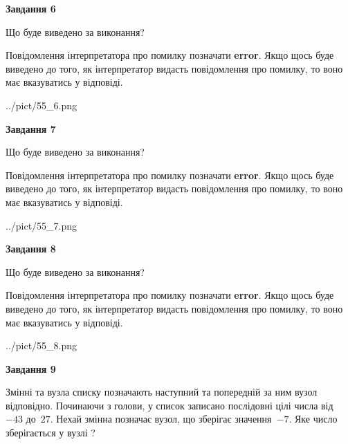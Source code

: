 \documentclass[12pt, ukrainian]{article}
\begin{document}
{\begin {large}
{\begin {center}\textbf{Завдання 6}\end {center}}\par
Що буде виведено за виконання?

Повідомлення інтерпретатора про помилку позначати \textbf{error}.
Якщо щось буде виведено до того, як інтерпретатор видасть повідомлення про помилку, 
то воно має вказуватись у відповіді. \par


\begin{center}
	{../pict/55_6.png}
\end{center}
\newpage

{\begin {center}\textbf{Завдання 7}\end {center}}\par
Що буде виведено за виконання?

Повідомлення інтерпретатора про помилку позначати \textbf{error}.
Якщо щось буде виведено до того, як інтерпретатор видасть повідомлення про помилку, 
то воно має вказуватись у відповіді. \par


\begin{center}
	{../pict/55_7.png}
\end{center}
\newpage

{\begin {center}\textbf{Завдання 8}\end {center}}\par
Що буде виведено за виконання?

Повідомлення інтерпретатора про помилку позначати \textbf{error}.
Якщо щось буде виведено до того, як інтерпретатор видасть повідомлення про помилку, 
то воно має вказуватись у відповіді. \par


\begin{center}
	{../pict/55_8.png}
\end{center}
\newpage

{\begin {center}\textbf{Завдання 9}\end {center}}\par
Змінні  та  вузла списку позначають наступний та попередній за ним вузол відповідно. Починаючи з голови, у список записано послідовні цілі числа від~$-43$ до~$27$. Нехай змінна  позначає вузол, що зберігає значення~$-7$.
Яке число зберігається у вузлі  ?\par
\newpage


\end{large}}
\end{document}
